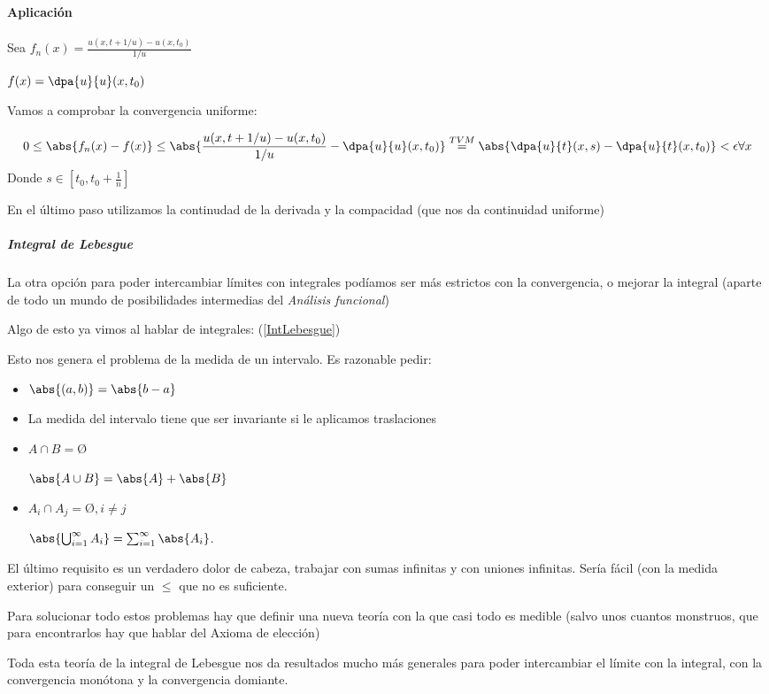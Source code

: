 \paragraph{Aplicación}

Sea $f_n(x) = \frac{u(x,t+1/u) - u(x,t_0)}{1/u}$

$f(x) = \dpa{u}{u}(x,t_0)$

Vamos a comprobar la convergencia uniforme:

\[0\leq \abs{f_n(x) - f(x)} \leq \abs{\frac{u(x,t+1/u) - u(x,t_0)}{1/u} - \dpa{u}{u}(x,t_0)} \stackrel{TVM}{=} \abs{\dpa{u}{t}(x,s) - \dpa{u}{t}(x,t_0)} < \epsilon \forall x\]
Donde $s\in [t_0,t_0+\frac{1}{n}]$

En el último paso utilizamos la continudad de la derivada y la compacidad (que nos da continuidad uniforme)


\subparagraph{Integral de Lebesgue}
La otra opción para poder intercambiar límites con integrales podíamos ser más estrictos con la convergencia, o mejorar la integral (aparte de todo un mundo de posibilidades intermedias del \textit{Análisis funcional}) 

Algo de esto ya vimos al hablar de integrales: (\ref{IntLebesgue})

Esto nos genera el problema de la medida de un intervalo. 
Es razonable pedir:
\begin{itemize}
\item $\abs{(a,b)} = \abs{b-a}$
\item La medida del intervalo tiene que ser invariante si le aplicamos traslaciones
\item $A\cap B = Ø $

$\abs{A \cup B} = \abs{A} + \abs{B}$
\item $A_i \cap A_j = Ø, i\neq j$

$\abs{\bigcup_{i=1}^{\infty} A_i} = \sum_{i=1}^{\infty} \abs{A_i}$.


\end{itemize}
El último requisito es un verdadero dolor de cabeza, trabajar con sumas infinitas y con uniones infinitas. Sería fácil (con la medida exterior) para conseguir un $\leq$ que no es suficiente.

Para solucionar todo estos problemas hay que definir una nueva teoría con la que casi todo es medible (salvo unos cuantos monstruos, que para encontrarlos hay que hablar del Axioma de elección)

Toda esta teoría de la integral de Lebesgue nos da resultados mucho más generales para poder intercambiar el límite con la integral, con la convergencia monótona y la convergencia domiante.
